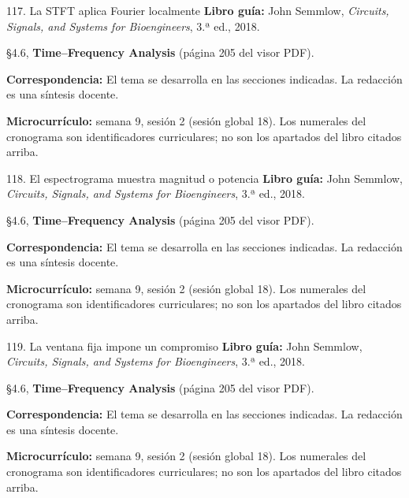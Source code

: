 \documentclass[
  10pt,
  ignorenonframetext,
  aspectratio=169,
  spanish,
]{beamer}
\begin{document}
\begin{frame}{117. La STFT aplica Fourier localmente}
\label{la-stft-aplica-fourier-localmente}
\textbf{Libro guía:} John Semmlow, \emph{Circuits, Signals, and Systems
for Bioengineers}, 3.ª ed., 2018.

§4.6, \textbf{Time--Frequency Analysis} (página 205 del visor PDF).

\textbf{Correspondencia:} El tema se desarrolla en las secciones
indicadas. La redacción es una síntesis docente.

\textbf{Microcurrículo:} semana 9, sesión 2 (sesión global 18). Los
numerales del cronograma son identificadores curriculares; no son los
apartados del libro citados arriba.
\end{frame}

\begin{frame}{118. El espectrograma muestra magnitud o potencia}
\label{el-espectrograma-muestra-magnitud-o-potencia}
\textbf{Libro guía:} John Semmlow, \emph{Circuits, Signals, and Systems
for Bioengineers}, 3.ª ed., 2018.

§4.6, \textbf{Time--Frequency Analysis} (página 205 del visor PDF).

\textbf{Correspondencia:} El tema se desarrolla en las secciones
indicadas. La redacción es una síntesis docente.

\textbf{Microcurrículo:} semana 9, sesión 2 (sesión global 18). Los
numerales del cronograma son identificadores curriculares; no son los
apartados del libro citados arriba.
\end{frame}

\begin{frame}{119. La ventana fija impone un compromiso}
\label{la-ventana-fija-impone-un-compromiso}
\textbf{Libro guía:} John Semmlow, \emph{Circuits, Signals, and Systems
for Bioengineers}, 3.ª ed., 2018.

§4.6, \textbf{Time--Frequency Analysis} (página 205 del visor PDF).

\textbf{Correspondencia:} El tema se desarrolla en las secciones
indicadas. La redacción es una síntesis docente.

\textbf{Microcurrículo:} semana 9, sesión 2 (sesión global 18). Los
numerales del cronograma son identificadores curriculares; no son los
apartados del libro citados arriba.
\end{frame}
\end{document}
